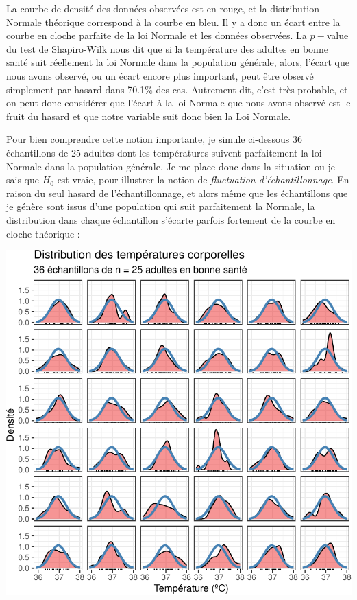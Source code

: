 \documentclass[
  a4paper,
  DIV=11,
  numbers=noendperiod,
  oneside]{scrreprt}
\begin{document}
La courbe de densité des données observées est en rouge, et la
distribution Normale théorique correspond à la courbe en bleu. Il y a
donc un écart entre la courbe en cloche parfaite de la loi Normale et
les données observées. La \(p-\)value du test de Shapiro-Wilk nous dit
que si la température des adultes en bonne santé suit réellement la loi
Normale dans la population générale, alors, l'écart que nous avons
observé, ou un écart encore plus important, peut être observé simplement
par hasard dans 70.1\% des cas. Autrement dit, c'est très probable, et
on peut donc considérer que l'écart à la loi Normale que nous avons
observé est le fruit du hasard et que notre variable suit donc bien la
Loi Normale.

Pour bien comprendre cette notion importante, je simule ci-dessous 36
échantillons de 25 adultes dont les températures suivent parfaitement la
loi Normale dans la population générale. Je me place donc dans la
situation ou je sais que \(H_0\) est vraie, pour illustrer la notion de
\emph{fluctuation d'échantillonnage}. En raison du seul hasard de
l'échantillonnage, et alors même que les échantillons que je génère sont
issus d'une population qui suit parfaitement la Normale, la distribution
dans chaque échantillon s'écarte parfois fortement de la courbe en
cloche théorique :

\includegraphics{01-OneSampleTests_files/figure-pdf/unnamed-chunk-19-1.pdf}
\end{document}
